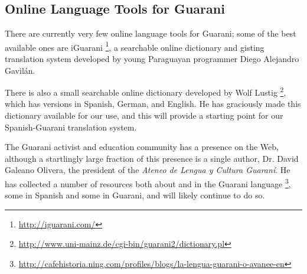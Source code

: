 \subsection{Online Language Tools for Guarani}
There are currently very few online language tools for Guarani; some of the
best available ones are iGuarani \footnote{\url{http://iguarani.com/}}, a
searchable online dictionary and gisting translation system developed by young
Paraguayan programmer Diego Alejandro Gavilán.

There is also a small searchable online dictionary developed by Wolf Lustig
\footnote{\url{http://www.uni-mainz.de/cgi-bin/guarani2/dictionary.pl}},
which has versions in Spanish, German, and English. He has graciously made this
dictionary available for our use, and this will provide a starting point for
our Spanish-Guarani translation system.

The Guarani activist and education community has a presence on the Web,
although a startlingly large fraction of this presence is a single author,
Dr. David Galeano Olivera, the president of the \emph{Ateneo de Lengua y
Cultura Guaraní}. He has collected a number of resources both about and in the
Guarani language
\footnote{\url{http://cafehistoria.ning.com/profiles/blogs/la-lengua-guarani-o-avanee-en}},
some in Spanish and some in Guarani, and will likely continue to do so.
